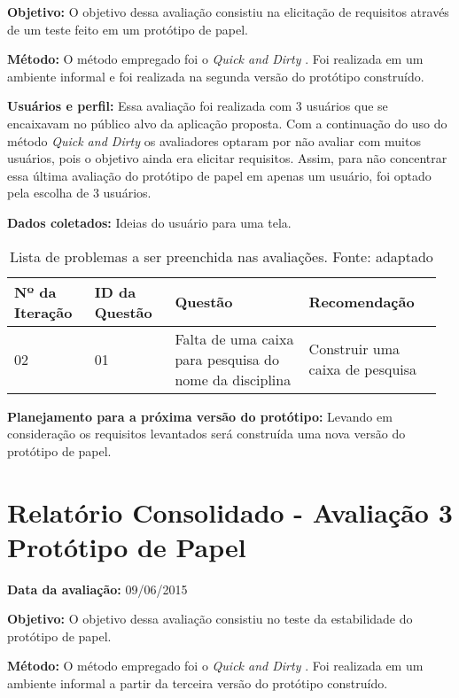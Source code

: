 \textbf{Objetivo:}
O objetivo dessa avaliação consistiu na elicitação de requisitos através de um teste feito em um protótipo de papel.

\textbf{Método:}
O método empregado foi o \textit{Quick and Dirty} \cite{preece}. Foi realizada em um ambiente informal e foi realizada na segunda versão do protótipo construído.

\textbf{Usuários e perfil:}
Essa avaliação foi realizada com 3 usuários que se encaixavam no público alvo da aplicação proposta. Com a continuação do uso do método \textit{Quick and Dirty} os avaliadores optaram por não avaliar com muitos usuários, pois o objetivo ainda era elicitar requisitos. Assim, para não concentrar essa última avaliação do protótipo de papel em apenas um usuário, foi optado pela escolha de 3 usuários.

\textbf{Dados coletados:}
Ideias do usuário para uma tela.

\begin{table*}[!h]
\caption{Lista de problemas a ser preenchida nas avaliações. Fonte: \cite{preece} adaptado}
\label{tab:problema}
  \begin{tabular}{p{0.18\linewidth}p{0.18\linewidth}p{0.30\linewidth}p{0.30\linewidth}}
  \hline
    Nº da Iteração & ID da Questão & Questão & Recomendação\\
 \hline
    02 & 01 & Falta de uma caixa para pesquisa do nome da disciplina & Construir uma caixa de pesquisa\\
  \end{tabular}
\end{table*}

\textbf{Planejamento para a próxima versão do protótipo:}
Levando em consideração os requisitos levantados será construída uma nova versão do protótipo de papel.

\vfill
\pagebreak
\section{Relatório Consolidado - Avaliação 3 Protótipo de Papel}

\textbf{Data da avaliação:} 09/06/2015

\textbf{Objetivo:}
O objetivo dessa avaliação consistiu no teste da estabilidade do protótipo de papel.

\textbf{Método:}
O método empregado foi o \textit{Quick and Dirty} \cite{preece}. Foi realizada em um ambiente informal a partir da terceira versão do protótipo construído.

